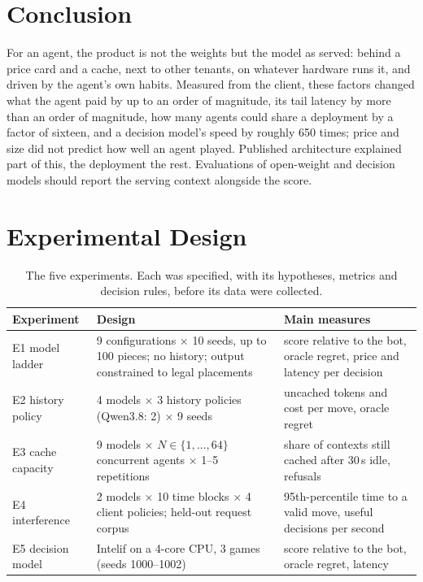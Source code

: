 \documentclass{article}
\begin{document}
\section{Conclusion}

For an agent, the product is not the weights but the model as served: behind a price card and a cache, next to other tenants, on whatever hardware runs it, and driven by the agent's own habits. Measured from the client, these factors changed what the agent paid by up to an order of magnitude, its tail latency by more than an order of magnitude, how many agents could share a deployment by a factor of sixteen, and a decision model's speed by roughly 650 times; price and size did not predict how well an agent played. Published architecture explained part of this, the deployment the rest. Evaluations of open-weight and decision models should report the serving context alongside the score.

\begingroup\raggedright

\endgroup


\newpage
\appendix
\onecolumn
\raggedbottom

\section{Experimental Design}
\label{app:experiments}

\begin{table}[H]
\caption{The five experiments. Each was specified, with its hypotheses, metrics and decision rules, before its data were collected.}
\label{tab:experiments}
\centering\small
\begin{tabularx}{\textwidth}{@{}lLL@{}}
\toprule
Experiment & Design & Main measures \\
\midrule
E1 model ladder & 9 configurations $\times$ 10 seeds, up to 100 pieces; no history; output constrained to legal placements & score relative to the bot, oracle regret, price and latency per decision \\
E2 history policy & 4 models $\times$ 3 history policies (Qwen3.8: 2) $\times$ 9 seeds & uncached tokens and cost per move, oracle regret \\
E3 cache capacity & 9 models $\times$ $N \in \{1, \dots, 64\}$ concurrent agents $\times$ 1--5 repetitions & share of contexts still cached after 30\,s idle, refusals \\
E4 interference & 2 models $\times$ 10 time blocks $\times$ 4 client policies; held-out request corpus & 95th-percentile time to a valid move, useful decisions per second \\
E5 decision model & Intelif on a 4-core CPU, 3 games (seeds 1000--1002) & score relative to the bot, oracle regret, latency \\
\bottomrule
\end{tabularx}
\end{table}
\end{document}
